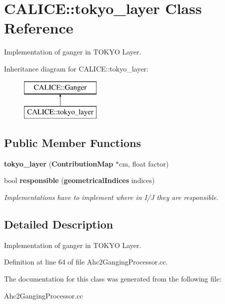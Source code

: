 \section{C\-A\-L\-I\-C\-E\-:\-:tokyo\-\_\-layer Class Reference}
\label{classCALICE_1_1tokyo__layer}


Implementation of ganger in T\-O\-K\-Y\-O Layer.  


Inheritance diagram for C\-A\-L\-I\-C\-E\-:\-:tokyo\-\_\-layer\-:\begin{figure}[H]
\begin{center}
\leavevmode
\includegraphics[height=2.000000cm]{classCALICE_1_1tokyo__layer}
\end{center}
\end{figure}
\subsection*{Public Member Functions}
\begin{DoxyCompactItemize}
\item 
{\bfseries tokyo\-\_\-layer} ({\bf Contribution\-Map} $\ast$cm, float factor)\label{classCALICE_1_1tokyo__layer_ae59ee4b18714f84f8fb57e9386721757}

\item 
bool {\bf responsible} ({\bf geometrical\-Indices} indices)\label{classCALICE_1_1tokyo__layer_af2110fc66083f23ae7baac020ddd1f37}

\begin{DoxyCompactList}\small\item\em Implementations have to implement where in I/\-J they are responsible. \end{DoxyCompactList}\end{DoxyCompactItemize}


\subsection{Detailed Description}
Implementation of ganger in T\-O\-K\-Y\-O Layer. 

Definition at line 64 of file Ahc2\-Ganging\-Processor.\-cc.



The documentation for this class was generated from the following file\-:\begin{DoxyCompactItemize}
\item 
Ahc2\-Ganging\-Processor.\-cc\end{DoxyCompactItemize}
